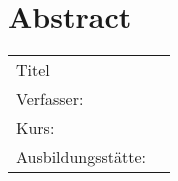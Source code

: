 \section*{Abstract}

	\begingroup
	\begin{table}[h!]
		\setlength\tabcolsep{0pt}
		\begin{tabular}{p{3.7cm}p{11.7cm}}
			Titel & \varTitle \\
			Verfasser: & \varName \\
			Kurs: & \varCourse \\
			Ausbildungsstätte: & \varCompany \\
		\end{tabular}
	\end{table}
	\endgroup
	
	\lipsum[150]